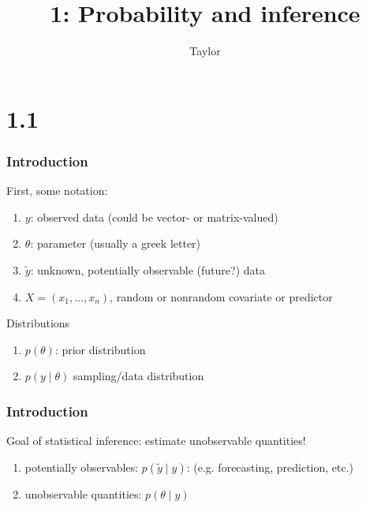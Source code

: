\documentclass{beamer}
\title["1"]{1: Probability and inference}
\author{Taylor}
\institute[UVA] 
{
University of Virginia \\
\medskip
\textit{} 
}
\date{}
\begin{document}

\begin{frame}
\titlepage 
\end{frame}

\section{1.1}

\begin{frame}
\frametitle{Introduction}

First, some notation:

\begin{enumerate}
\item $y$: observed data (could be vector- or matrix-valued)
\item $\theta$: parameter (usually a greek letter)
\item $\tilde{y}$: unknown, potentially observable (future?) data
\item $X = (x_1, \ldots, x_n)$, random or nonrandom covariate or predictor
\end{enumerate}
\pause

Distributions
\begin{enumerate}
\item $p(\theta)$: prior distribution
\item $p(y \mid \theta)$ sampling/data distribution
\end{enumerate}

\end{frame}

\begin{frame}
\frametitle{Introduction}

Goal of statistical inference: estimate unobservable quantities!
\begin{enumerate}
\item potentially observables: $p(\tilde{y} \mid y)$:  (e.g. forecasting, prediction, etc.)
\item unobservable quantities: $p(\theta \mid y)$  
\end{enumerate}


\end{frame}
\end{document}
